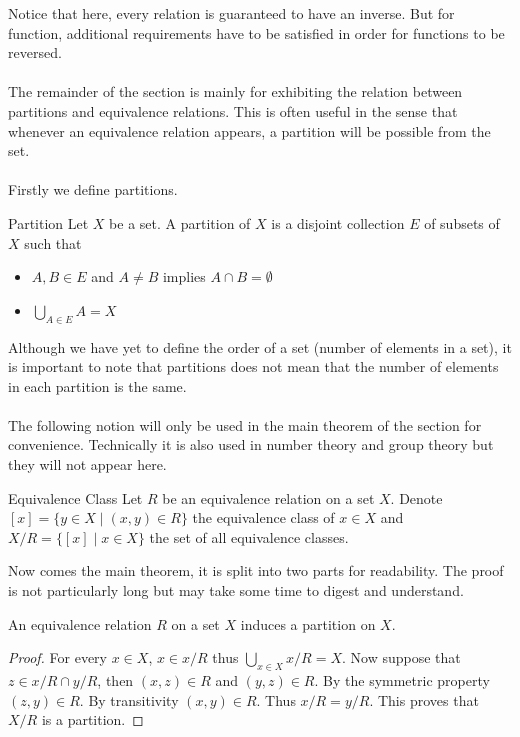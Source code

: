 \documentclass[a4paper]{article}
\begin{document}
Notice that here, every relation is guaranteed to have an inverse. But for function, additional requirements have to be satisfied in order for functions to be reversed. \\~\\

The remainder of the section is mainly for exhibiting the relation between partitions and equivalence relations. This is often useful in the sense that whenever an equivalence relation appears, a partition will be possible from the set. \\~\\
Firstly we define partitions. 

\begin{defn}{Partition}{} Let $X$ be a set. A partition of $X$ is a disjoint collection $E$ of subsets of $X$ such that
\begin{itemize}
\item $A,B\in E$ and $A\neq B$ implies $A\cap B=\emptyset$
\item $\bigcup_{A\in E}A=X$
\end{itemize}
\end{defn}

Although we have yet to define the order of a set (number of elements in a set), it is important to note that partitions does not mean that the number of elements in each partition is the same. \\~\\

The following notion will only be used in the main theorem of the section for convenience. Technically it is also used in number theory and group theory but they will not appear here. 

\begin{defn}{Equivalence Class}{} Let $R$ be an equivalence relation on a set $X$. Denote $[x]=\{y\in X\;|\;(x,y)\in R\}$ the equivalence class of $x\in X$ and $X/R=\{[x]\;|\;x\in X\}$ the set of all equivalence classes. 
\end{defn}

Now comes the main theorem, it is split into two parts for readability. The proof is not particularly long but may take some time to digest and understand. 

\begin{thm}{}{} An equivalence relation $R$ on a set $X$ induces a partition on $X$. \tcbline
\begin{proof}
For every $x\in X$, $x\in x/R$ thus $\bigcup_{x\in X}x/R=X$. Now suppose that $z\in x/R\cap y/R$, then $(x,z)\in R$ and $(y,z)\in R$. By the symmetric property $(z,y)\in R$. By transitivity $(x,y)\in R$. Thus $x/R=y/R$. This proves that $X/R$ is a partition. 
\end{proof}
\end{thm}
\end{document}
